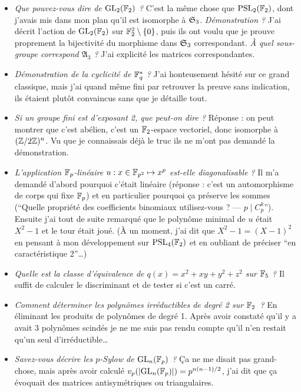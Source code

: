 \documentclass[a4paper, 11pt]{article}
\begin{document}
\begin{itemize}
\item \emph{Que pouvez-vous dire de $\mathrm{GL}_2(\mathbb{F}_2)$ ?} C'est la même chose que
  $\mathrm{PSL}_2(\mathbb{F}_2)$, dont j'avais mis dans mon plan qu'il est isomorphe à
  $\mathfrak{S}_3$. \emph{Démonstration ?} J'ai décrit l'action de $\mathrm{GL}_2(\mathbb{F}_2)$ sur
  $\mathbb{F}_2^2 \setminus \{0\}$, puis ils ont voulu que je prouve proprement la
  bijectivité du morphisme dans $\mathfrak{S}_3$ correspondant. \emph{À quel
    sous-groupe correspond $\mathfrak{A}_3$ ?} J'ai explicité les matrices
  correspondantes.
\item \emph{Démonstration de la cyclicité de $\mathbb{F}_q^*$ ?} J'ai honteusement
  hésité sur ce grand classique, mais j'ai quand même fini par retrouver la
  preuve sans indication, ils étaient plutôt convaincus sans que je détaille
  tout.
\item \emph{Si un groupe fini est d'exposant 2, que peut-on dire ?} Réponse : on
  peut montrer que c'est abélien, c'est un $\mathbb{F}_2$-espace vectoriel, donc
  isomorphe à $(\mathbb{Z}/2\mathbb{Z})^n$. Vu que je connaissais déjà le truc ils ne m'ont pas
  demandé la démonstration.
\item \emph{L'application $\mathbb{F}_p$-linéaire $u : x \in \mathbb{F}_{p^2} \mapsto x^p$
    est-elle diagonalisable ?} Il m'a demandé d'abord pourquoi c'était linéaire
  (réponse : c'est un automorphisme de corps qui fixe $\mathbb{F}_p$) et en particulier
  pourquoi ça préserve les sommes (\enquote{Quelle propriété des coefficients
    binomiaux utilisez-vous ? --- $p \mid C_p^k$}). Ensuite j'ai tout de suite
  remarqué que le polynôme minimal de $u$ était $X^2 - 1$ et le tour était joué.
  (À un moment, j'ai dit que $X^2 - 1 = (X-1)^2$ en pensant à mon développement
  sur $\mathrm{PSL}_4(\mathbb{F}_2)$ et en oubliant de préciser \enquote{en caractéristique 2}…)
\item \emph{Quelle est la classe d'équivalence de $q(x) = x^2 + xy + y^2 + z^2$
    sur $\mathbb{F}_5$ ?} Il suffit de calculer le discriminant et de tester si c'est un
  carré.
\item \emph{Comment déterminer les polynômes irréductibles de degré 2 sur
    $\mathbb{F}_2$~?} En éliminant les produits de polynômes de degré 1. Après avoir
  constaté qu'il y a avait 3 polynômes scindés je ne me suis pas rendu compte
  qu'il n'en restait qu'un seul d'irréductible…
\item \emph{Savez-vous décrire les $p$-Sylow de $\mathrm{GL}_n(\mathbb{F}_p)$ ?} Ça ne me disait
  pas grand-chose, mais après avoir calculé $v_p(|\mathrm{GL}_n(\mathbb{F}_p)|) = p^{n(n-1)/2}$,
  j'ai dit que ça évoquait des matrices antisymétriques ou triangulaires.

\end{itemize}
\end{document}
